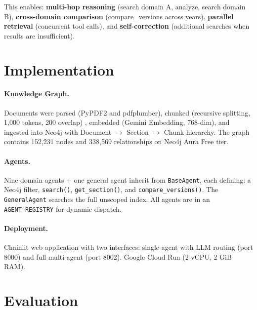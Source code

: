 \documentclass[11pt,a4paper]{article}
\begin{document}
This enables: \textbf{multi-hop reasoning} (search domain A, analyze, search domain B), \textbf{cross-domain comparison} (compare\_versions across years), \textbf{parallel retrieval} (concurrent tool calls), and \textbf{self-correction} (additional searches when results are insufficient).


\section{Implementation}
\label{sec:implementation}

\paragraph{Knowledge Graph.} Documents were parsed (PyPDF2 and pdfplumber), chunked (recursive splitting, 1{,}000 tokens, 200 overlap) \cite{langchain2024recursive}, embedded (Gemini Embedding, 768-dim), and ingested into Neo4j with Document $\rightarrow$ Section $\rightarrow$ Chunk hierarchy. The graph contains 152,231 nodes and 338,569 relationships on Neo4j Aura Free tier.

\paragraph{Agents.} Nine domain agents + one general agent inherit from \texttt{BaseAgent}, each defining: a Neo4j filter, \texttt{search()}, \texttt{get\_section()}, and \texttt{compare\_versions()}. The \texttt{GeneralAgent} searches the full unscoped index. All agents are in an \texttt{AGENT\_REGISTRY} for dynamic dispatch.

\paragraph{Deployment.} Chainlit web application with two interfaces: single-agent with LLM routing (port 8000) and full multi-agent (port 8002). Google Cloud Run (2 vCPU, 2 GiB RAM).


\section{Evaluation}
\label{sec:evaluation}
\end{document}
